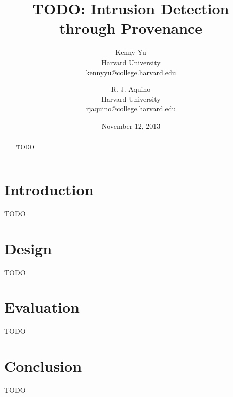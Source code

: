 \documentclass[10pt,twocolumn]{article}
\title{TODO: Intrusion Detection through Provenance}
\author{
    Kenny Yu\\
    Harvard University\\
    kennyyu@college.harvard.edu
  \and
    R. J. Aquino\\
    Harvard University\\
    rjaquino@college.harvard.edu
}
\date{November 12, 2013}
\begin{document}
\maketitle


\begin{abstract}
TODO
\end{abstract}


\section{Introduction}
TODO


\section{Design}
TODO


\section{Evaluation}
TODO


\section{Conclusion}
TODO

\end{document}
